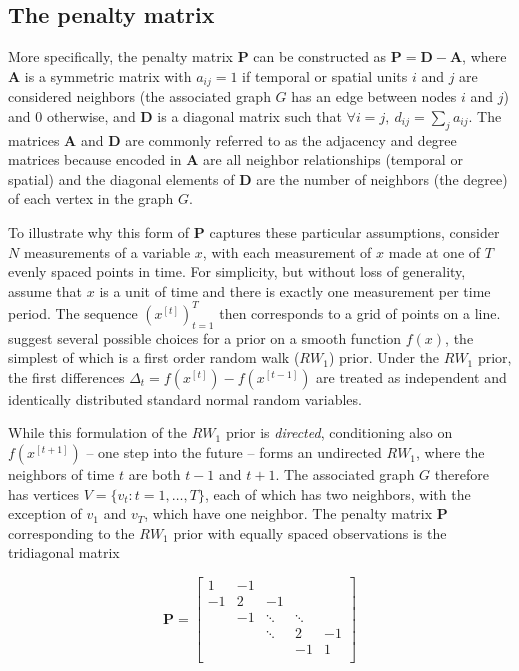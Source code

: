\subsection{The penalty matrix} 
\label{penalty_matrix}

More specifically, the penalty matrix $\mathbf{P}$ can be constructed as  $\mathbf{P} = \mathbf{D} - \mathbf{A}$, where $\mathbf{A}$ is a symmetric matrix with $a_{ij} = 1$ if temporal or spatial units $i$ and $j$ are considered neighbors (the associated graph $G$ has an edge between nodes $i$ and $j$) and 0 otherwise, and $\mathbf{D}$ is a diagonal matrix such that $\forall i = j, \: d_{ij} = \sum_j a_{ij}$. The matrices $\mathbf{A}$ and $\mathbf{D}$ are commonly referred to as the adjacency and degree matrices because encoded in $\mathbf{A}$ are all neighbor relationships (temporal or spatial) and the diagonal elements of $\mathbf{D}$ are the number of neighbors (the degree) of each vertex in the graph $G$.

To illustrate why this form of $\mathbf{P}$ captures these particular assumptions, consider $N$ measurements of a variable $x$, with each measurement of $x$ made at one of $T$ evenly spaced points in time. For simplicity, but without loss of generality,  assume that $x$ is a unit of time and there is exactly one measurement per time period.  The sequence $(x^{[t]})_{t=1}^T$ then corresponds to a grid of points on a line.   suggest several possible choices for a prior on a smooth function $f(x)$, the simplest of which is a first order random walk ($RW_1$) prior.  Under the $RW_1$ prior, the first differences $\Delta_t = f(x^{[t]}) - f(x^{[t-1]})$ are treated as independent and identically distributed standard normal random variables. 

While this formulation of the $RW_1$ prior is {\it directed}, conditioning also on $f(x^{[t+1]})$ -- one step into the future -- forms an undirected $RW_1$, where the neighbors of time $t$ are both $t-1$ and $t+1$.  The associated graph $G$ therefore has vertices $V=\{v_t : t=1,\dots,T\}$, each of which has two neighbors, with the exception of $v_1$ and $v_T$, which have one neighbor. The penalty matrix $\mathbf{P}$ corresponding to the $RW_1$ prior with equally spaced observations is the tridiagonal matrix

\begin{equation*}
\mathbf{P} = 
\begin{bmatrix}
1  	& -1 	& 		& 	& \\
-1  	& 2 	& -1 		& 	& \\
  	& -1 	& \ddots 	& \ddots	& \\
  	&  	& \ddots 	& 2 	& -1\\
  	&  	& 		& -1 	& 1\\
\end{bmatrix}
\end{equation*}

